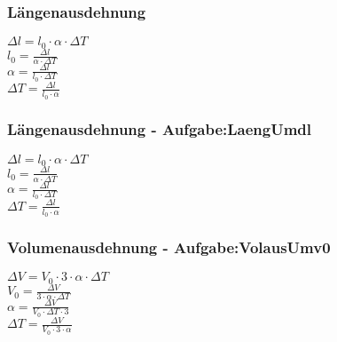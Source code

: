 \subsubsection{Längenausdehnung} 
\begin{minipage}{0.45\textwidth} 
$ \Delta l = l_{0} \cdot \alpha \cdot \Delta T $\\ 
$ l_{0}  = \frac{ \Delta l}{\alpha \cdot \Delta T} $\\ 
$ \alpha  = \frac{ \Delta l}{l_{0} \cdot \Delta T} $\\ 
$ \Delta T = \frac{ \Delta l}{l_{0} \cdot \alpha } $\\ 
\end{minipage} 
\begin{minipage}{0.45\textwidth} 
 
\end{minipage} 
\subsubsection{Längenausdehnung - Aufgabe:LaengUmdl} 
\begin{minipage}{0.45\textwidth} 
$ \Delta l = l_{0} \cdot \alpha \cdot \Delta T $\\ 
$ l_{0}  = \frac{ \Delta l}{\alpha \cdot \Delta T} $\\ 
$ \alpha  = \frac{ \Delta l}{l_{0} \cdot \Delta T} $\\ 
$ \Delta T = \frac{ \Delta l}{l_{0} \cdot \alpha } $\\ 
\end{minipage} 
\begin{minipage}{0.45\textwidth} 
 
\end{minipage} 
\subsubsection{Volumenausdehnung - Aufgabe:VolausUmv0} 
\begin{minipage}{0.45\textwidth} 
$ \Delta V = V_{0} \cdot 3\cdot \alpha \cdot \Delta T $\\ 
$ V_{0}  = \frac{  \Delta V}{3\cdot \alpha \cdot \Delta T} $\\ 
$ \alpha  = \frac{  \Delta V}{V_{0} \cdot \Delta T\cdot 3} $\\ 
$ \Delta T = \frac{  \Delta V}{V_{0} \cdot 3\cdot \alpha } $\\ 
\end{minipage} 
\begin{minipage}{0.45\textwidth} 
 
\end{minipage} 
